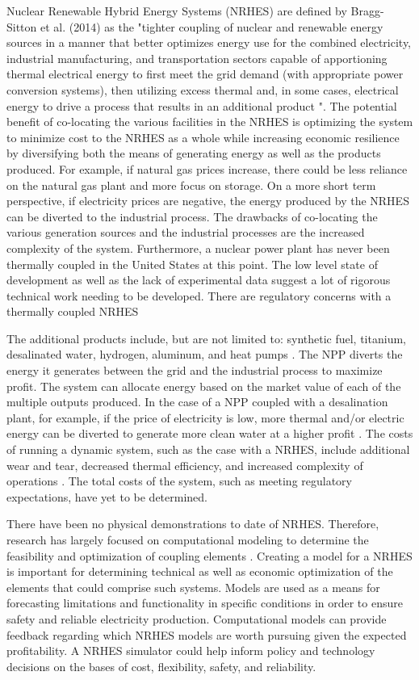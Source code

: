 \documentclass{article}                                                                           %
\begin{document}
\begin{linenumbers}
Nuclear Renewable Hybrid Energy Systems (NRHES) are defined by Bragg-Sitton et al. (2014) as the "tighter coupling of nuclear and renewable energy sources in a manner that better optimizes energy use for the combined electricity, industrial manufacturing, and transportation sectors capable of apportioning thermal electrical energy to first meet the grid demand (with appropriate power conversion systems), then utilizing excess thermal and, in some cases, electrical energy to drive a process that results in an additional product \cite {Bragg-Sitton2014}".  The potential benefit of co-locating the various facilities in the NRHES is optimizing the system to minimize cost to the NRHES as a whole while increasing economic resilience by diversifying both the means of generating energy as well as the products produced. For example, if natural gas prices increase, there could be less reliance on the natural gas plant and more focus on storage.  On a more short term perspective, if electricity prices are negative, the energy produced by the NRHES can be diverted to the industrial process. The drawbacks of co-locating the various generation sources and the industrial processes are the increased complexity of the system.  Furthermore, a nuclear power plant has never been thermally coupled in the United States at this point.  The low level state of development as well as the lack of experimental data suggest a lot of rigorous technical work needing to be developed.  There are regulatory concerns with a thermally coupled NRHES  

The additional products include, but are not limited to: synthetic fuel, titanium, desalinated water, hydrogen, aluminum, and heat pumps \cite{Bienvenue2015}. The NPP diverts the energy it generates between the grid and the industrial process to maximize profit. The system can allocate energy based on the market value of each of the multiple outputs produced. In the case of a NPP coupled with a desalination plant, for example, if the price of electricity is low, more thermal and/or electric energy can be diverted to generate more clean water at a higher profit \cite {Chen2016}. The costs of running a dynamic system, such as the case with a NRHES, include additional wear and tear, decreased thermal efficiency, and increased complexity of operations \cite{Garcia2013}. The total costs of the system, such as meeting regulatory expectations, have yet to be determined.

There have been no physical demonstrations to date of NRHES. Therefore, research has largely focused on computational modeling to determine the feasibility and optimization of coupling elements \cite{Boardman2013, Shropshire2012}. Creating a model for a NRHES is important for determining technical as well as economic optimization of the elements that could comprise such systems. Models are used as a means for forecasting limitations and functionality in specific conditions in order to ensure safety and reliable electricity production. Computational models can provide feedback regarding which NRHES models are worth pursuing given the expected profitability. A NRHES simulator could help inform policy and technology decisions on the bases of cost, flexibility, safety, and reliability. 


\end{linenumbers}
\end{document}
